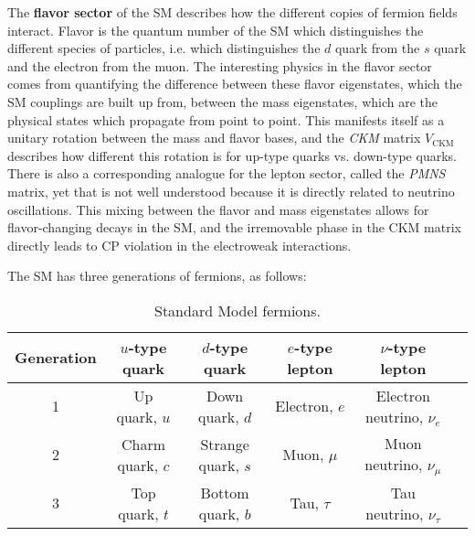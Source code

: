 \documentclass[11pt, oneside]{article}   	%
\theoremstyle{definition}
\begin{document}
The \textbf{flavor sector} of the SM describes how the different copies of fermion fields interact. Flavor is the quantum number 
of the SM which distinguishes the different species of particles, i.e. which distinguishes the $d$ quark from the $s$ quark and the 
electron from the muon. The interesting physics in the flavor sector comes from quantifying the difference between these 
flavor eigenstates, which the SM couplings are built up from, between the mass eigenstates, which are the physical states which 
propagate from point to point. This manifests itself as a unitary rotation between the mass and flavor bases, and the 
\textit{CKM} matrix $V_\mathrm{CKM}$ describes how different this rotation is for up-type quarks vs. down-type quarks. There 
is also a corresponding analogue for the lepton sector, called the \textit{PMNS} matrix, yet that is not well understood because 
it is directly related to neutrino oscillations. This mixing between the flavor and mass eigenstates allows for flavor-changing decays 
in the SM, and the irremovable phase in the CKM matrix directly leads to CP violation in the electroweak interactions. 

The SM has three generations of fermions, as follows:
\begin{table}[H]
	\centering
	\begin{tabular}{ | c | c | c | c | c | c | }
		\hline
		Generation & $u$-type quark & $d$-type quark & $e$-type lepton &$\nu$-type lepton \\
		\hline
		1 & Up quark, $u$ & Down quark, $d$ & Electron, $e$ & Electron neutrino, $\nu_e$ \\
		\hline
		2 & Charm quark, $c$ & Strange quark, $s$ & Muon, $\mu$ & Muon neutrino, $\nu_\mu$ \\
		\hline
		3 & Top quark, $t$ & Bottom quark, $b$ & Tau, $\tau$ & Tau neutrino, $\nu_\tau$ \\
		\hline
	\end{tabular}
	\caption{Standard Model fermions.}
	\label{table:lattice_details}
\end{table}
\end{document}
